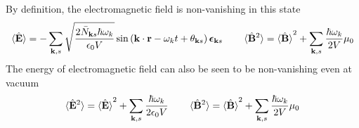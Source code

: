 \documentclass[../../../main.tex]{subfiles}
\begin{document}
By definition, the electromagnetic field is non-vanishing in this state
\begin{align*}
  \braket{  \hat{\mathbf{E}}  }
      =  - \sum_{\mathbf{k},s} \sqrt{\frac{2\bar{N}_{\mathbf{k}s}\hbar \omega_k }{ \epsilon_0 V}}  \sin   \left( \mathbf{k} \cdot \mathbf{r} - \omega_k t+\theta_{\mathbf{k}s}  \right) \boldsymbol{\epsilon}_{\mathbf{k}s}\qquad
  \braket{  \hat{\mathbf{B}}^2 }
   = \braket{\hat{\mathbf{B}} }^2+\sum_{\mathbf{k },s}\frac{\hbar \omega_k}{2 V} \mu_0
\end{align*}
The energy of electromagnetic field can also be seen to be non-vanishing even at vacuum
\begin{equation*}
    \braket{  \hat{\mathbf{E}}^2 }
    = \braket{\hat{\mathbf{E}} }^2+\sum_{\mathbf{k },s}\frac{\hbar \omega_k }{2\epsilon_0 V}\qquad
  \braket{  \hat{\mathbf{B}}^2 }
    = \braket{\hat{\mathbf{B}} }^2+\sum_{\mathbf{k },s}\frac{\hbar \omega_k}{2 V} \mu_0
\end{equation*}
\end{document}
